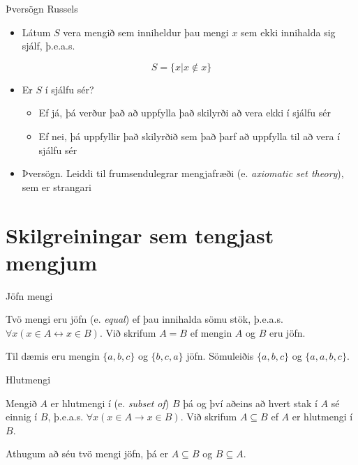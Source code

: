 \documentclass{beamer}
\begin{document}
\begin{frame}{Þversögn Russels}
\begin{itemize}
 \item Látum $S$ vera mengið sem inniheldur þau mengi $x$ sem ekki innihalda sig sjálf, þ.e.a.s.
\end{itemize}
\[
 S = \{x | x \notin x\}
\]
\begin{itemize}
 \item Er $S$ í sjálfu sér? \pause
 \begin{itemize}
  \item Ef já, þá verður það að uppfylla það skilyrði að vera ekki í sjálfu sér \pause
  \item Ef nei, þá uppfyllir það skilyrðið sem það þarf að uppfylla til að vera í sjálfu sér \pause
 \end{itemize}
 \item Þversögn. Leiddi til frumsendulegrar mengjafræði (e. \emph{axiomatic set theory}), sem er strangari
\end{itemize}
\end{frame}

\section{Skilgreiningar sem tengjast mengjum}

\begin{frame}{Jöfn mengi}
\begin{tcolorbox}[title=Jöfn mengi]
Tvö mengi eru jöfn (e. \emph{equal}) ef þau innihalda sömu stök, þ.e.a.s. $\forall x (x \in A \leftrightarrow x \in B ) $. Við skrifum $A = B$ ef mengin $A$ og $B$ eru jöfn.
\end{tcolorbox}
Til dæmis eru mengin $\{a, b, c\}$ og $\{b, c, a\}$ jöfn. Sömuleiðis $\{a, b, c\}$ og $\{a, a, b, c\}$.
\end{frame}

\begin{frame}{Hlutmengi}
\begin{tcolorbox}[title=Hlutmengi]
Mengið $A$ er hlutmengi í (e. \emph{subset of}) $B$ þá og því aðeins að hvert stak í $A$ sé einnig í $B$, þ.e.a.s. $\forall x (x \in A \to x \in B)$. Við skrifum $A \subseteq B$ ef $A$ er hlutmengi í $B$.
\end{tcolorbox}

Athugum að séu tvö mengi jöfn, þá er $A \subseteq B$ og $B \subseteq A$.
\end{frame}
\end{document}
